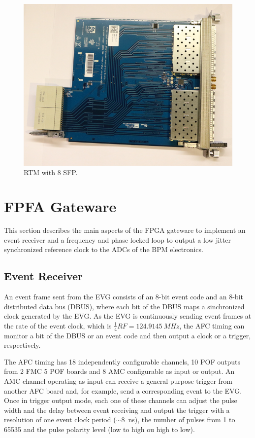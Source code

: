 \documentclass[a4paper,
               biblatex,      %
               ]{jacow}
\begin{document}
\begin{figure}[!htb]
   \centering
   \includegraphics*[width=0.8\columnwidth]{RTM_SFP_resized}
   \caption{RTM with 8 SFP.}
   \label{fig:rtm_sfp}
\end{figure}

\section{FPFA Gateware}

This section describes the main aspects of the FPGA gateware to implement an event receiver and a frequency and phase locked loop to output a low jitter synchronized reference clock to the ADCs of the BPM electronics.

\subsection{Event Receiver}

An event frame sent from the EVG consists of an 8-bit event code and an 8-bit distributed data bus (DBUS), where each bit of the DBUS maps a sinchronized clock generated by the EVG.
As the EVG is continuously sending event frames at the rate of the event clock, which is $\frac{1}{4}RF=124.9145~MHz$, the AFC timing can monitor a bit of the DBUS or an event code and then output a clock or a trigger, respectively. 

The AFC timing has 18 independently configurable channels, 10 POF outputs from 2 FMC 5 POF boards and 8 AMC configurable as input or output. An AMC channel operating as input can receive a general purpose trigger from another AFC board and, for example, send a corresponding event to the EVG. Once in trigger output mode, each one of these channels can adjust the pulse width and the delay between event receiving and output the trigger with a resolution of one event clock period ($\sim$8~ns), the number of pulses from 1 to 65535 and the pulse polarity level (low to high ou high to low).  
\end{document}
